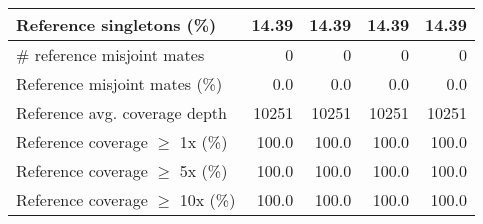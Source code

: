 \documentclass[12pt,a4paper]{article}
\begin{document}
\begin{table}[ht]
\begin{center}
\begin{tabular}{|l*{4}{|r}|}
Reference singletons (\%) & 14.39 & 14.39 & 14.39 & 14.39 \\ \hline
\# reference misjoint mates & 0 & 0 & 0 & 0 \\ \hline
Reference misjoint mates (\%) & 0.0 & 0.0 & 0.0 & 0.0 \\ \hline
Reference avg. coverage depth & 10251 & 10251 & 10251 & 10251 \\ \hline
Reference coverage $\geq$ 1x (\%) & 100.0 & 100.0 & 100.0 & 100.0 \\ \hline
Reference coverage $\geq$ 5x (\%) & 100.0 & 100.0 & 100.0 & 100.0 \\ \hline
Reference coverage $\geq$ 10x (\%) & 100.0 & 100.0 & 100.0 & 100.0 \\ \hline
\end{tabular}
\end{center}
\end{table}
\end{document}
